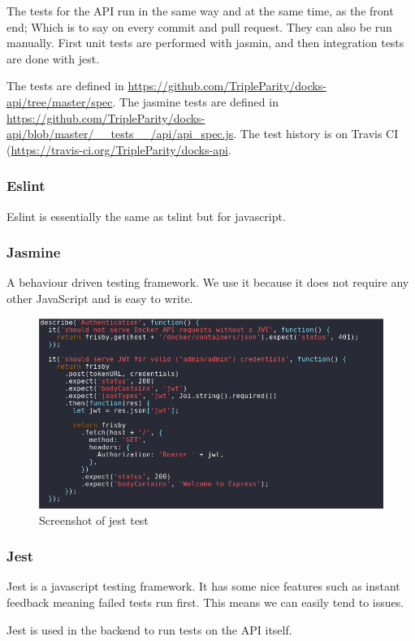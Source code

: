 \documentclass[]{article}
\begin{document}
The tests for the API run in the same way and at the same time, as the front end; Which is to
say on every commit and pull request. They can also be run manually. First unit
tests are performed with jasmin, and then integration tests are done with jest.

The tests are defined in \url{https://github.com/TripleParity/docks-api/tree/master/spec}.
The jasmine tests are defined in \url{https://github.com/TripleParity/docks-api/blob/master/__tests__/api/api_spec.js}.
The test history is on Travis CI (\url{https://travis-ci.org/TripleParity/docks-api}.

\subsubsection{Eslint}
Eslint is essentially the same as tslint but for javascript.

\subsubsection{Jasmine}
A behaviour driven testing framework. We use it because it 
does not require any other JavaScript and is easy to write.

\begin{figure}[H]
 	\centering
	\includegraphics[scale=0.5]{jest.png}
	\caption{Screenshot of jest test}
\end{figure}


\subsubsection{Jest}
Jest is a javascript testing framework.
It has some nice features such as instant feedback meaning
failed tests run first. This means we can easily tend to issues.

Jest is used in the backend to run tests on the API itself.
\end{document}
